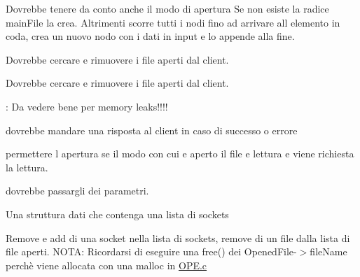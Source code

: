 
\begin{DoxyRefList}
\item[\label{todo__todo000006}%
\hypertarget{todo__todo000006}{}%
global\+Scope$>$ Globale \hyperlink{StruttureDati_8c_a221594d999c22ce87c14e50cd98287a2}{append\+Opened\+File} (char $\ast$nomefile, int modo, int socket)]Dovrebbe tenere da conto anche il modo di apertura Se non esiste la radice main\+File la crea. Altrimenti scorre tutti i nodi fino ad arrivare all\textquotesingle{} elemento in coda, crea un nuovo nodo con i dati in input e lo appende alla fine.  
\item[\label{todo__todo000001}%
\hypertarget{todo__todo000001}{}%
global\+Scope$>$ Globale \hyperlink{BYE_8h_a2e130b9a6559e17fb5a989e57aaa0945}{handle\+Bye\+Command} (int)]Dovrebbe cercare e rimuovere i file aperti dal client.  
\item[\label{todo__todo000001}%
\hypertarget{todo__todo000001}{}%
global\+Scope$>$ Globale \hyperlink{BYE_8h_a2e130b9a6559e17fb5a989e57aaa0945}{handle\+Bye\+Command} (int)]Dovrebbe cercare e rimuovere i file aperti dal client.  
\item[\label{todo__todo000003}%
\hypertarget{todo__todo000003}{}%
global\+Scope$>$ Globale \hyperlink{OPE_8c_a6eccb6ec6ec9c8375e70ab4088b511a5}{handle\+Open\+Command} (char $\ast$command, int socket)]\+: Da vedere bene per memory leaks!!!!  
\item[\label{todo__todo000002}%
\hypertarget{todo__todo000002}{}%
File \hyperlink{OPE_8c}{O\+P\+E.c} ]dovrebbe mandare una risposta al client in caso di successo o errore 

permettere l\textquotesingle{} apertura se il modo con cui e\textquotesingle{} aperto il file e\textquotesingle{} lettura e viene richiesta la lettura.  
\item[\label{todo__todo000004}%
\hypertarget{todo__todo000004}{}%
global\+Scope$>$ Globale \hyperlink{server_8c_a5e7b14672f9e2c9fa99b363004afb8e8}{spawn\+Thread} ()]dovrebbe passargli dei parametri.  
\item[\label{todo__todo000005}%
\hypertarget{todo__todo000005}{}%
File \hyperlink{StruttureDati_8c}{Strutture\+Dati.c} ]Una struttura dati che contenga una lista di sockets 

Remove e add di una socket nella lista di sockets, remove di un file dalla lista di file aperti. N\+O\+T\+A\+: Ricordarsi di eseguire una free() dei Opened\+File-\/$>$file\+Name perchè viene allocata con una malloc in \hyperlink{OPE_8c}{O\+P\+E.\+c}
\end{DoxyRefList}